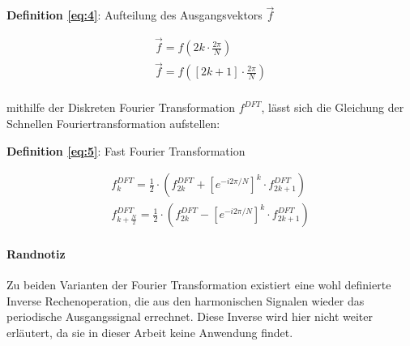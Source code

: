 \begin{flushleft}
	\textbf{Definition \eqref{eq:4}}: Aufteilung des Ausgangsvektors $\vec{f}$
\end{flushleft}
\vspace{\baselineskip}
\begin{equation}
	\begin{gathered}
		\vec{f} = f(2k \cdot \frac{2\pi}{N}) \\
		\vec{f} = f( \left[ 2k+1\right]  \cdot \frac{2\pi}{N}) \\
	\end{gathered}\label{eq:4}
\end{equation}

mithilfe der Diskreten Fourier Transformation $f^{DFT}$, lässt sich die Gleichung der Schnellen Fouriertransformation aufstellen:

\begin{flushleft}
	\textbf{Definition \eqref{eq:5}}: Fast Fourier Transformation \cite{arenz_fourier}
\end{flushleft}
\vspace{\baselineskip}
\begin{equation}
	\begin{gathered}
		{f}_{k}^{DFT} = \frac{1}{2} \cdot ({f}_{2k}^{DFT} + \left[ e^{-i 2 \pi / N}\right] ^{k} \cdot {f}_{2k+1}^{DFT}) \\
		{f}_{k+\frac{N}{2}}^{DFT} = \frac{1}{2} \cdot ({f}_{2k}^{DFT} - \left[ e^{-i 2 \pi / N}\right] ^{k} \cdot {f}_{2k+1}^{DFT})
	\end{gathered}\label{eq:5}
\end{equation}



\paragraph{Randnotiz}
Zu beiden Varianten der Fourier Transformation existiert eine wohl definierte Inverse Rechenoperation, die aus den harmonischen Signalen wieder das periodische Ausgangssignal errechnet. Diese Inverse wird hier nicht weiter erläutert, da sie in dieser Arbeit keine Anwendung findet. 